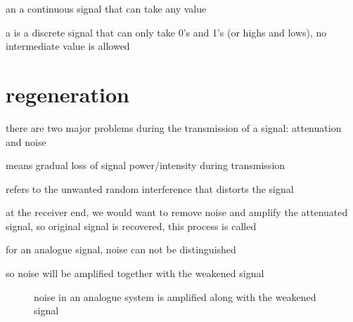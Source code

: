 \rcyskip

\begin{ilight}
	an   a continuous signal that can take any value
\end{ilight}

\begin{ilight}	
	a  is a discrete signal that can only take 0's and 1's (or highs and lows), no intermediate value is allowed
\end{ilight}



\section{regeneration}

there are two major problems during the transmission of a signal: attenuation and noise

\begin{ilight}
	 means gradual loss of signal power/intensity during transmission
\end{ilight}

\begin{ilight}
	 refers to the unwanted random interference that distorts the signal
\end{ilight}

at the receiver end, we would want to remove noise and amplify the attenuated signal, so original signal is recovered, this process is called 


\cmt for an analogue signal, noise can not be distinguished

so noise will be amplified together with the weakened signal

\begin{figure}[ht]
	\centering
	
	\caption*{noise in an analogue system is amplified along with the weakened signal}
\end{figure}

